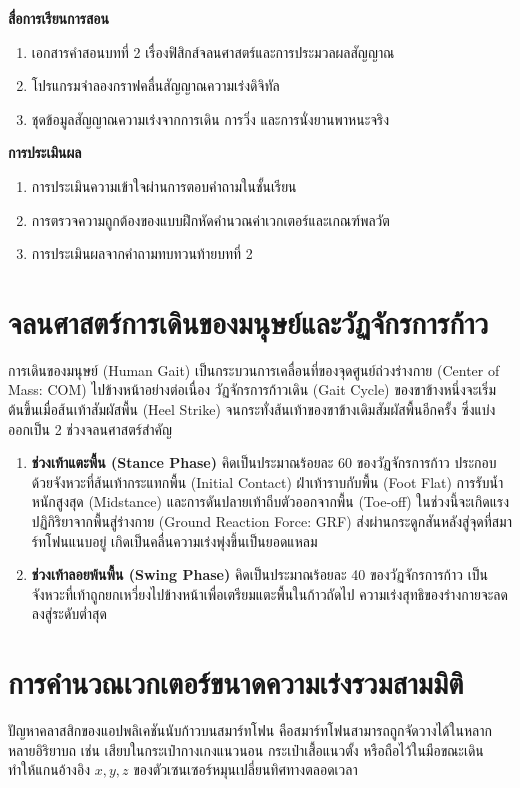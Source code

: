 \noindent\textbf{สื่อการเรียนการสอน}
\begin{enumerate}
    \item เอกสารคำสอนบทที่ 2 เรื่องฟิสิกส์จลนศาสตร์และการประมวลผลสัญญาณ
    \item โปรแกรมจำลองกราฟคลื่นสัญญาณความเร่งดิจิทัล
    \item ชุดข้อมูลสัญญาณความเร่งจากการเดิน การวิ่ง และการนั่งยานพาหนะจริง
\end{enumerate}

\noindent\textbf{การประเมินผล}
\begin{enumerate}
    \item การประเมินความเข้าใจผ่านการตอบคำถามในชั้นเรียน
    \item การตรวจความถูกต้องของแบบฝึกหัดคำนวณค่าเวกเตอร์และเกณฑ์พลวัต
    \item การประเมินผลจากคำถามทบทวนท้ายบทที่ 2
\end{enumerate}

\newpage

\section{จลนศาสตร์การเดินของมนุษย์และวัฏจักรการก้าว}
การเดินของมนุษย์ (Human Gait) เป็นกระบวนการเคลื่อนที่ของจุดศูนย์ถ่วงร่างกาย (Center of Mass: COM) ไปข้างหน้าอย่างต่อเนื่อง วัฏจักรการก้าวเดิน (Gait Cycle) ของขาข้างหนึ่งจะเริ่มต้นขึ้นเมื่อส้นเท้าสัมผัสพื้น (Heel Strike) จนกระทั่งส้นเท้าของขาข้างเดิมสัมผัสพื้นอีกครั้ง ซึ่งแบ่งออกเป็น 2 ช่วงจลนศาสตร์สำคัญ

\begin{enumerate}
    \item \textbf{ช่วงเท้าแตะพื้น (Stance Phase)} คิดเป็นประมาณร้อยละ 60 ของวัฏจักรการก้าว ประกอบด้วยจังหวะที่ส้นเท้ากระแทกพื้น (Initial Contact) ฝ่าเท้าราบกับพื้น (Foot Flat) การรับน้ำหนักสูงสุด (Midstance) และการดันปลายเท้าถีบตัวออกจากพื้น (Toe-off) ในช่วงนี้จะเกิดแรงปฏิกิริยาจากพื้นสู่ร่างกาย (Ground Reaction Force: GRF) ส่งผ่านกระดูกสันหลังสู่จุดที่สมาร์ทโฟนแนบอยู่ เกิดเป็นคลื่นความเร่งพุ่งขึ้นเป็นยอดแหลม
    \item \textbf{ช่วงเท้าลอยพ้นพื้น (Swing Phase)} คิดเป็นประมาณร้อยละ 40 ของวัฏจักรการก้าว เป็นจังหวะที่เท้าถูกยกเหวี่ยงไปข้างหน้าเพื่อเตรียมแตะพื้นในก้าวถัดไป ความเร่งสุทธิของร่างกายจะลดลงสู่ระดับต่ำสุด
\end{enumerate}

\section{การคำนวณเวกเตอร์ขนาดความเร่งรวมสามมิติ}
ปัญหาคลาสสิกของแอปพลิเคชันนับก้าวบนสมาร์ทโฟน คือสมาร์ทโฟนสามารถถูกจัดวางได้ในหลากหลายอิริยาบถ เช่น เสียบในกระเป๋ากางเกงแนวนอน กระเป๋าเสื้อแนวตั้ง หรือถือไว้ในมือขณะเดิน ทำให้แกนอ้างอิง $x, y, z$ ของตัวเซนเซอร์หมุนเปลี่ยนทิศทางตลอดเวลา

